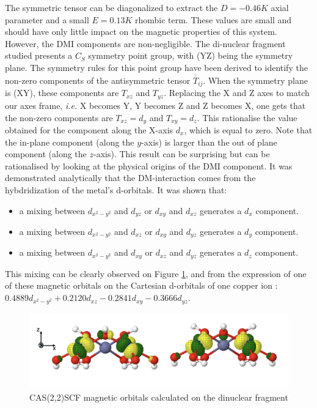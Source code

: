 \documentclass[12pt]{report}
\numberwithin{equation}{section}
\begin{document}
The symmetric tensor can be diagonalized to extract the $ D = - 0.46 K $ axial parameter and a small $ E = 0.13 K$ rhombic term.
These values are small and should have only little impact on the magnetic properties of this system.
However, the DMI components are non-negligible. 
The di-nuclear fragment studied presents a $C_S$ symmetry point group, with (YZ) being the symmetry plane. 
The symmetry rules for this point group have been derived to identify the non-zero components of the antisymmetric tensor $\overline{\overline{T}}_{ij}$.
When the symmetry plane is (XY), these components are $T_{xz}$ and $T_{yz}$.
Replacing the X and Z axes to match our axes frame, \textit{i.e.} X becomes Y, Y becomes Z and Z becomes X, one gets that the non-zero components are $T_{xz}=d_y$ and $T_{xy}=d_z$.
This rationalise the value obtained for the component along the X-axis $d_x$, which is equal to zero.
Note that the in-plane component (along the $y$-axis) is larger than the out of plane component (along the $z$-axis). 
This result can be surprising but can be rationalised by looking at the physical origins of the DMI component.
It was demonstrated analytically that the DM-interaction comes from the hybdridization of the metal's d-orbitals. 
It was shown that:
\begin{itemize}
    \item a mixing between $ d_{x^2-y^2}$ and $ d_{yz}$ or $ d_{xy}$ and $d_{xz}$ generates a $ d_{x}$ component.
    \item a mixing between $d_{x^2-y^2}$ and $ d_{xz}$ or $ d_{xy}$ and $d_{yz}$ generates a $ d_{y}$ component.
    \item a mixing between $ d_{x^2-y^2}$ and $d_{xy}$ or $ d_{xz}$ and $d_{yz}$ generates a $ d_{z}$ component.
\end{itemize}

This mixing can be clearly observed on Figure \ref{CAS22}, and from the expression of one of these magnetic orbitals on the Cartesian
d-orbitals of one copper ion : $0.4889d_{x^2-y^2}+0.2120d_{xz}-0.2841d_{xy}-0.3666d_{yz}$.

\begin{figure}[!ht]
    \centering
    \includegraphics[width=\textwidth]{Images/CAS22.png}
    \caption{CAS(2,2)SCF magnetic orbitals calculated on the dinuclear fragment}
    \label{CAS22}
\end{figure}
\end{document}

